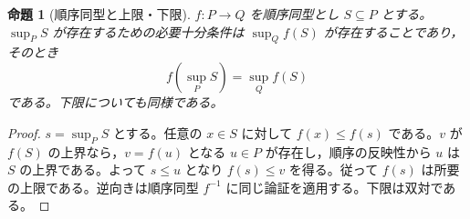\documentclass[a5paper,10pt,dvipdfmx]{jsarticle}
\theoremstyle{definition}
\theoremstyle{plain}
\newtheorem{prop}[ruledef]{命題}
\begin{document}
\begin{prop}[順序同型と上限・下限]\label{k78}
$f:P\to Q$ を順序同型とし $S\subseteq P$ とする。$\sup_P S$ が存在するための必要十分条件は $\sup_Q f(S)$ が存在することであり，そのとき
\[
 f(\sup_P S)=\sup_Q f(S)
\]
である。下限についても同様である。
\end{prop}
\begin{proof}
$s=\sup_P S$ とする。任意の $x\in S$ に対して $f(x)\leq f(s)$ である。$v$ が $f(S)$ の上界なら，$v=f(u)$ となる $u\in P$ が存在し，順序の反映性から $u$ は $S$ の上界である。よって $s\leq u$ となり $f(s)\leq v$ を得る。従って $f(s)$ は所要の上限である。逆向きは順序同型 $f^{-1}$ に同じ論証を適用する。下限は双対である。
\end{proof}
\end{document}
